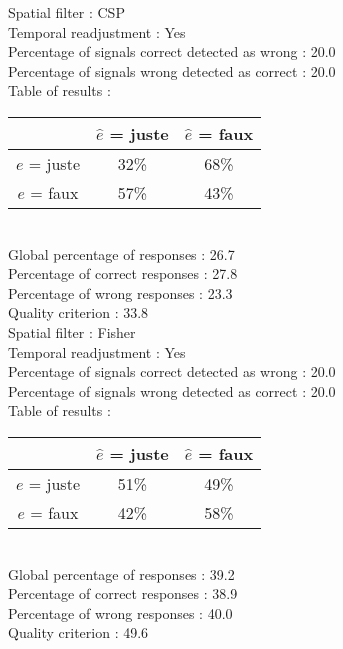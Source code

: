 Spatial filter : CSP \\
Temporal readjustment : Yes \\
Percentage of signals correct detected as wrong :   20.0 \\
Percentage of signals wrong detected as correct :   20.0 \\
Table of results : \\
\begin{tabular}{|c|c|c|}
\hline				& $\hat{e}$ = juste & $\hat{e}$ = faux \\
\hline  $e$ = juste	&     32\%			&     68\%		\\
\hline  $e$ = faux	&     57\%			&     43\%		\\
\hline
\end{tabular}\\
Global percentage of responses :   26.7 \\
Percentage of correct responses :   27.8 \\
Percentage of wrong responses :   23.3 \\
Quality criterion :   33.8 \\

Spatial filter : Fisher \\
Temporal readjustment : Yes \\
Percentage of signals correct detected as wrong :   20.0 \\
Percentage of signals wrong detected as correct :   20.0 \\
Table of results : \\
\begin{tabular}{|c|c|c|}
\hline				& $\hat{e}$ = juste & $\hat{e}$ = faux \\
\hline  $e$ = juste	&     51\%			&     49\%		\\
\hline  $e$ = faux	&     42\%			&     58\%		\\
\hline
\end{tabular}\\
Global percentage of responses :   39.2 \\
Percentage of correct responses :   38.9 \\
Percentage of wrong responses :   40.0 \\
Quality criterion :   49.6 \\

